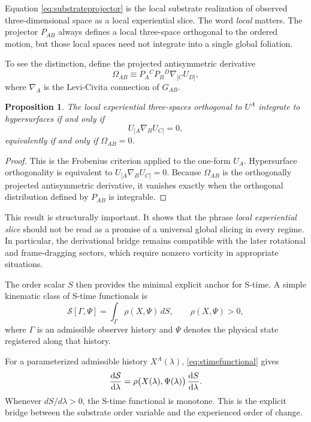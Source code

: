 \documentclass[11pt]{article}
\newcommand{\Order}{\mathcal{S}}
\newtheorem{proposition}{Proposition}
\begin{document}
Equation \eqref{eq:substrateprojector} is the local substrate realization of observed three-dimensional space as a local experiential slice. The word \emph{local} matters. The projector \(P_{AB}\) always defines a local three-space orthogonal to the ordered motion, but those local spaces need not integrate into a single global foliation.

To see the distinction, define the projected antisymmetric derivative
\begin{equation}
\Omega_{AB}
\equiv
P_A{}^C P_B{}^D \nabla_{[C} U_{D]},
\label{eq:substratevorticity}
\end{equation}
where \(\nabla_A\) is the Levi-Civita connection of \(G_{AB}\).

\begin{proposition}
The local experiential three-spaces orthogonal to \(U^A\) integrate to hypersurfaces if and only if
\begin{equation}
U_{[A}\nabla_B U_{C]} = 0,
\label{eq:substratefrobenius}
\end{equation}
equivalently if and only if \(\Omega_{AB}=0\).
\end{proposition}

\begin{proof}
This is the Frobenius criterion applied to the one-form \(U_A\). Hypersurface orthogonality is equivalent to \(U_{[A}\nabla_B U_{C]}=0\). Because \(\Omega_{AB}\) is the orthogonally projected antisymmetric derivative, it vanishes exactly when the orthogonal distribution defined by \(P_{AB}\) is integrable.
\end{proof}

This result is structurally important. It shows that the phrase \emph{local experiential slice} should not be read as a promise of a universal global slicing in every regime. In particular, the derivational bridge remains compatible with the later rotational and frame-dragging sectors, which require nonzero vorticity in appropriate situations.

The order scalar \(S\) then provides the minimal explicit anchor for S-time. A simple kinematic class of S-time functionals is
\begin{equation}
\Order[\Gamma,\Psi]
=
\int_{\Gamma} \rho(X,\Psi)\, dS,
\qquad
\rho(X,\Psi) > 0,
\label{eq:stimefunctional}
\end{equation}
where \(\Gamma\) is an admissible observer history and \(\Psi\) denotes the physical state registered along that history.

For a parameterized admissible history \(X^A(\lambda)\), \eqref{eq:stimefunctional} gives
\begin{equation}
\dv{\Order}{\lambda}
=
\rho\bigl(X(\lambda),\Psi(\lambda)\bigr)\,
\dv{S}{\lambda}.
\label{eq:stimonotone}
\end{equation}
Whenever \(dS/d\lambda > 0\), the S-time functional is monotone. This is the explicit bridge between the substrate order variable and the experienced order of change.
\end{document}
